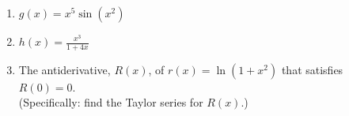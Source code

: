\documentclass[11 pt]{article}
\newcommand{\tr}{\vspace{0.5in}}
\newcommand{\mr}{\vspace{2.0in}}
\newcommand{\be}{\begin{enumerate}}
\newcommand{\ee}{\end{enumerate}}
\begin{document}
\begin{enumerate}
		\be
			\item $g(x) = x^5 \sin(x^2)$
			
			\mr \tr
			
			\item $h(x) =  \frac{x^3}{1 + 4x}$
			
			\mr \tr
			
			\item The antiderivative, $R(x)$, of $r(x) = \ln(1 + x^2)$ that satisfies $R(0) = 0$. \\  (Specifically: find the Taylor series for $R(x)$.)
			
			
		\ee


	
\end{enumerate}
\end{document}

